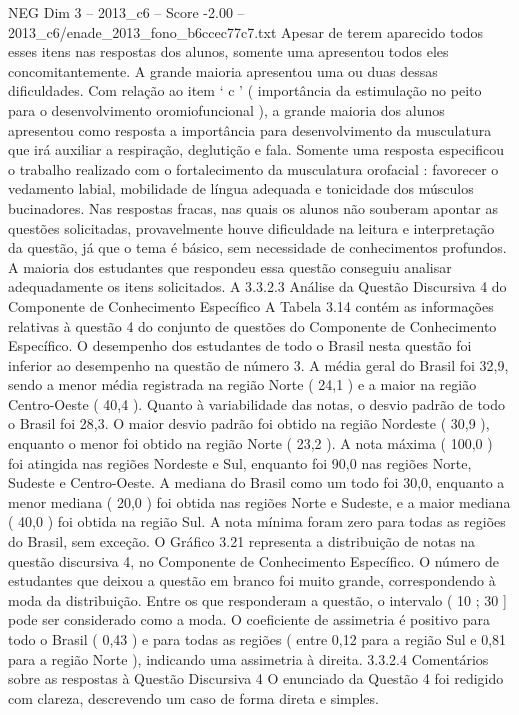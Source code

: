 \begin{textsample}{NEG Dim 3 – 2013\_c6 – Score -2.00 – 2013\_c6/enade\_2013\_fono\_b6ccec77c7.txt}
Apesar de terem aparecido todos esses itens nas respostas dos alunos, somente uma apresentou todos eles concomitantemente.
A grande maioria apresentou uma ou duas dessas dificuldades.
Com relação ao item ‘ c ’ ( importância da estimulação no peito para o desenvolvimento oromiofuncional ), a grande maioria dos alunos apresentou como resposta a importância para desenvolvimento da musculatura que irá auxiliar a respiração, deglutição e fala.
Somente uma resposta especificou o trabalho realizado com o fortalecimento da musculatura orofacial : favorecer o vedamento labial, mobilidade de língua adequada e tonicidade dos músculos bucinadores.
Nas respostas fracas, nas quais os alunos não souberam apontar as questões solicitadas, provavelmente houve dificuldade na leitura e interpretação da questão, já que o tema é básico, sem necessidade de conhecimentos profundos.
A maioria dos estudantes que respondeu essa questão conseguiu analisar adequadamente os itens solicitados.
A 3.3.2.3 Análise da Questão Discursiva 4 do Componente de Conhecimento Específico A Tabela 3.14 contém as informações relativas à questão 4 do conjunto de questões do Componente de Conhecimento Específico.
O desempenho dos estudantes de todo o Brasil nesta questão foi inferior ao desempenho na questão de número 3.
A média geral do Brasil foi 32,9, sendo a menor média registrada na região Norte ( 24,1 ) e a maior na região Centro-Oeste ( 40,4 ).
Quanto à variabilidade das notas, o desvio padrão de todo o Brasil foi 28,3.
O maior desvio padrão foi obtido na região Nordeste ( 30,9 ), enquanto o menor foi obtido na região Norte ( 23,2 ).
A nota máxima ( 100,0 ) foi atingida nas regiões Nordeste e Sul, enquanto foi 90,0 nas regiões Norte, Sudeste e Centro-Oeste.
A mediana do Brasil como um todo foi 30,0, enquanto a menor mediana ( 20,0 ) foi obtida nas regiões Norte e Sudeste, e a maior mediana ( 40,0 ) foi obtida na região Sul.
A nota mínima foram zero para todas as regiões do Brasil, sem exceção.
O Gráfico 3.21 representa a distribuição de notas na questão discursiva 4, no Componente de Conhecimento Específico.
O número de estudantes que deixou a questão em branco foi muito grande, correspondendo à moda da distribuição.
Entre os que responderam a questão, o intervalo ( 10 ; 30 ] pode ser considerado como a moda.
O coeficiente de assimetria é positivo para todo o Brasil ( 0,43 ) e para todas as regiões ( entre 0,12 para a região Sul e 0,81 para a região Norte ), indicando uma assimetria à direita. 3.3.2.4 Comentários sobre as respostas à Questão Discursiva 4 O enunciado da Questão 4 foi redigido com clareza, descrevendo um caso de forma direta e simples.

\end{textsample}

